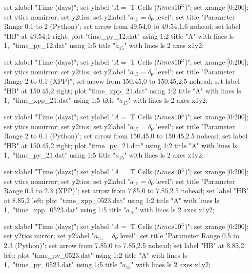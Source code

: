 \startGNUPLOTscript[time_py_12]
  set xlabel "Time (days)";
  set ylabel "$A = $ T Cells ($\\times 10^3$)";
  set xrange [0:200];
  set ytics nomirror;
  set y2tics;
  set y2label "$a_{15} = δₚ$ level";
  set title "Parameter Range 0.1 to 2 (Python)";
  set arrow from 49.54,0 to 49.54,1.6 nohead;
  set label "HB" at 49.54,1 right;
  plot "time_py_12.dat" using 1:2 title "A" with lines ls 1,\
       "time_py_12.dat" using 1:5 title "$a_{15}$" with lines ls 2 axes x1y2;
\stopGNUPLOTscript

  set xlabel "Time (days)";
  set ylabel "$A = $ T Cells ($\\times 10^3$)";
  set xrange [0:200];
  set ytics nomirror;
  set y2tics;
  set y2label "$a_{15} = δₚ$ level";
  set title "Parameter Range 2 to 0.1 (XPP)";
  set arrow from 150.45,0 to 150.45,2.5 nohead;
  set label "HB" at 150.45,2 right;
  plot "time_xpp_21.dat" using 1:2 title "A" with lines ls 1,\
       "time_xpp_21.dat" using 1:5 title "$a_{15}$" with lines ls 2 axes x1y2;
\stopGNUPLOTscript

\startGNUPLOTscript[time_py_21]
  set xlabel "Time (days)";
  set ylabel "$A = $ T Cells ($\\times 10^3$)";
  set xrange [0:200];
  set ytics nomirror;
  set y2tics;
  set y2label "$a_{15} = δₚ$ level";
  set title "Parameter Range 2 to 0.1 (Python)";
  set arrow from 150.45,0 to 150.45,2.5 nohead;
  set label "HB" at 150.45,2 right;
  plot "time_py_21.dat" using 1:2 title "A" with lines ls 1,\
       "time_py_21.dat" using 1:5 title "$a_{15}$" with lines ls 2 axes x1y2;
\stopGNUPLOTscript

  set xlabel "Time (days)";
  set ylabel "$A = $ T Cells ($\\times 10^3$)";
  set xrange [0:200];
  set ytics nomirror;
  set y2tics;
  set y2label "$a_{15} = δₚ$ level";
  set title "Parameter Range 0.5 to 2.3 (XPP)";
  set arrow from 7.85,0 to 7.85,2.5 nohead;
  set label "HB" at 8.85,2 left;
  plot "time_xpp_0523.dat" using 1:2 title "A" with lines ls 1,\
       "time_xpp_0523.dat" using 1:5 title "$a_{15}$" with lines ls 2 axes x1y2;
\stopGNUPLOTscript

\startGNUPLOTscript[time_py_0523]
  set xlabel "Time (days)";
  set ylabel "$A = $ T Cells ($\\times 10^3$)";
  set xrange [0:200];
  set y2tics mirror;
  set y2label "$a_{15} = δₚ$ level";
  set title "Parameter Range 0.5 to 2.3 (Python)";
  set arrow from 7.85,0 to 7.85,2.5 nohead;
  set label "HB" at 8.85,2 left;
  plot "time_py_0523.dat" using 1:2 title "A" with lines ls 1,\
       "time_py_0523.dat" using 1:5 title "$a_{15}$" with lines ls 2 axes x1y2;
\stopGNUPLOTscript

